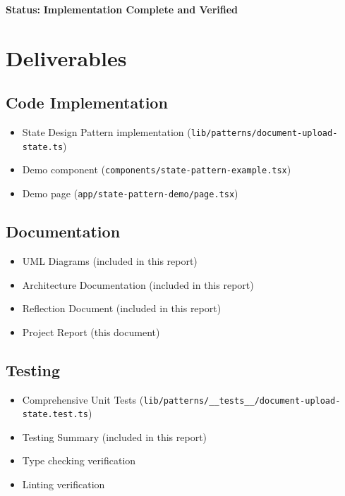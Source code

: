 \documentclass[11pt,a4paper]{article}
\begin{document}
\textbf{Status:} \textbf{Implementation Complete and Verified}

\section{Deliverables}

\subsection{Code Implementation}

\begin{itemize}
    \item State Design Pattern implementation (\texttt{lib/patterns/document-upload-state.ts})
    \item Demo component (\texttt{components/state-pattern-example.tsx})
    \item Demo page (\texttt{app/state-pattern-demo/page.tsx})
\end{itemize}

\subsection{Documentation}

\begin{itemize}
    \item UML Diagrams (included in this report)
    \item Architecture Documentation (included in this report)
    \item Reflection Document (included in this report)
    \item Project Report (this document)
\end{itemize}

\subsection{Testing}

\begin{itemize}
    \item Comprehensive Unit Tests (\texttt{lib/patterns/\_\_tests\_\_/document-upload-state.test.ts})
    \item Testing Summary (included in this report)
    \item Type checking verification
    \item Linting verification
\end{itemize}

\appendix
\end{document}
